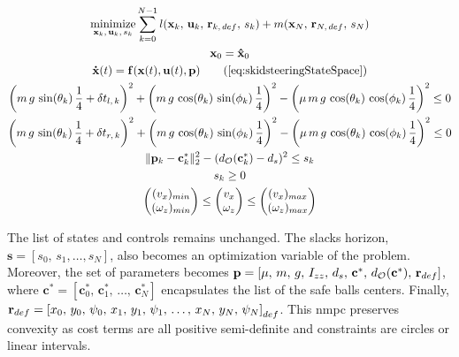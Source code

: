 \begin{subequations}
	\begin{gather}
		\underset{\mathbf{x}_k,\,\mathbf{u}_k,\,s_k}{\text{minimize}} \sum_{k=0}^{N-1} \lagrangeTerm{\mathbf{\x}_k,\,\mathbf{u}_k,\,\mathbf{r}_{k,\,def},\,s_k} + \mayerTerm{\mathbf{\x}_N,\,\mathbf{r}_{N,\,def},\,s_N} \label{subeq:costonestagesafeocp}\\
			\mathbf{x}_0 = \mathbf{\hat{x}}_0\\
			\DerMathBold{x}(t) = \processModel{\mathbf{x}(t), \mathbf{u}(t), \mathbf{p}} \tag{\ref{eq:skidsteeringStateSpace}}\\
			\left(m\,g\,\sin(\pitch_k)\,\frac{1}{4}+\delta\Traction_{l,\,k}\right)^2 + \left(m\,g\,\cos(\pitch_k)\,\sin(\roll_k)\,\frac{1}{4}\right)^2 - \left(\FrictionCoefficient\,m\,g\,\cos(\pitch_k)\,\cos(\roll_k)\,\frac{1}{4}\right)^2 \leq 0 \label{subeq:frictionconetlsafeocp}\\
			\left(m\,g\,\sin(\pitch_k)\,\frac{1}{4}+\delta\Traction_{r,\,k}\right)^2 + \left(m\,g\,\cos(\pitch_k)\,\sin(\roll_k)\,\frac{1}{4}\right)^2 - \left(\FrictionCoefficient\,m\,g\,\cos(\pitch_k)\,\cos(\roll_k)\,\frac{1}{4}\right)^2 \leq 0 \label{subeq:frictionconetrsafeocp}\\
			\|\mathbf{p}_k - \mathbf{c}_k^*\|_2^2 - (d_\ObstacleSpace(\mathbf{c}_k^*) - d_s)^2 \leq s_k \label{subeq:ciaocirclesarea}\\
			s_k \geq 0 \label{subeq:slackbounds}\\
			\begin{pmatrix}
			(v_x)_{min}\\
			(\omega_z)_{min}
			\end{pmatrix} \leq \begin{pmatrix}
			v_x\\
			\omega_z
			\end{pmatrix} \leq \begin{pmatrix}
			(v_x)_{max}\\
			(\omega_z)_{max}
			\end{pmatrix}
	\end{gather}
	\label{eq:safeonestageocp}
\end{subequations}

The list of states and controls remains unchanged. The slacks horizon, $\mathbf{s} = \left[s_0,\,s_1,\ldots,s_N\right]$, also becomes an optimization variable of the problem. Moreover, the set of parameters becomes $\mathbf{p} = \left[\mu,\,m,\,g,\,I_{zz},\,d_s,\,\mathbf{c}^*,\,d_{\mathcal{O}}(\mathbf{c}^*),\,\mathbf{r}_{def}\right]$, where $\mathbf{c}^* = \left[\mathbf{c}_0^*,\,\mathbf{c}_1^*,\,\ldots,\,\mathbf{c}_N^*\right]$ encapsulates the list of the safe balls centers. Finally, $\mathbf{r}_{def} = \left[x_0,\,y_0,\,\psi_0,\,x_1,\,y_1,\,\psi_1,\,\ldots,\,x_N,\,y_N,\,\psi_N\right]_{def}$. This \acrshort{nmpc} preserves convexity as cost terms are all positive semi-definite and constraints are circles or linear intervals.

